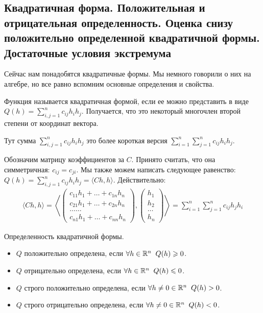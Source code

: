 \subsection{Квадратичная форма. Положительная и отрицательная определенность. Оценка снизу положительно определенной квадратичной формы. Достаточные условия экстремума}
Сейчас нам понадобятся квадратичные формы.
Мы немного говорили о них на алгебре, но все равно вспомним основные определения и свойства.
\begin{conj}
    Функция называется квадратичная формой, если ее можно представить в виде $Q(h) = \sum\limits_{i, j = 1}^n c_{ij}h_ih_j$.
    Получается, что это некоторый многочлен второй степени от координат вектора.
\end{conj}
Тут сумма $\sum\limits_{i, j = 1}^n c_{ij}h_ih_j$ это более короткая версия $\sum\limits_{i=1}^n\sum\limits_{j=1}^n c_{ij}h_ih_j$.

Обозначим матрицу коэффициентов за $C$.
Принято считать, что она симметричная: $c_{ij} = c_{ji}$.
Мы также можем написать следующее равенство: $Q(h) = \sum\limits_{i, j = 1}^n c_{ij}h_ih_j = \langle Ch, h \rangle$.
Действительно: \begin{gather*}
    \langle Ch, h \rangle = \left \langle \begin{pmatrix}
        c_{11}h_1 + \dots + c_{1n}h_n \\
        c_{21}h_1 + \dots + c_{2n}h_n \\
        \dots \dots \\
        c_{n1}h_1 + \dots + c_{nn}h_n
    \end{pmatrix}, \begin{pmatrix}
        h_1 \\
        h_2 \\
        \dots \\
        h_n
    \end{pmatrix} \right \rangle = 
    \sum_{i=1}^n \sum_{j=1}^n c_{ij}h_jh_i
\end{gather*}

\begin{conj} Определенность квадратичной формы.

    \begin{itemize}
        \item $Q$ положительно определена, если $\forall h \in \mathbb{R}^n \;\; Q(h) \geqslant 0$.
        \item $Q$ отрицательно определена, если $\forall h \in \mathbb{R}^n \;\; Q(h) \leqslant 0$.
        \item $Q$ строго положительно определена, если $\forall h \neq 0 \in \mathbb{R}^n \;\; Q(h) > 0$.
        \item $Q$ строго отрицательно определена, если $\forall h \neq 0 \in \mathbb{R}^n \;\; Q(h) < 0$. 
    \end{itemize}
\end{conj}

